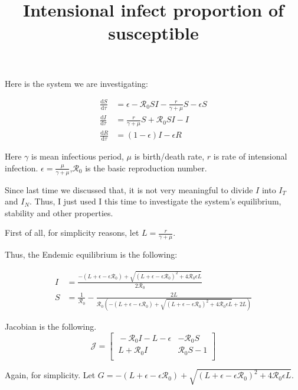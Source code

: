 \documentclass[12pt]{article}
\title{Intensional infect proportion of susceptible}
\begin{document}
\maketitle

Here is the system we are investigating:
\begin{flushleft}
\begin{align}
\frac{\mathrm{d}S}{\mathrm{d}\tau}&=\epsilon -\mathcal{R}_0 SI-\frac{r}{\gamma+\mu} S-\epsilon S\\
\frac{\mathrm{d}I}{\mathrm{d}\tau}&=\frac{r}{\gamma+\mu}S+\mathcal{R}_0 SI-I\\
\frac{\mathrm{d}R}{\mathrm{d}\tau}&=(1-\epsilon)I-\epsilon R
\end{align}

Here $\gamma$ is mean infectious period, $\mu$ is birth/death rate, $r$ is rate of intensional infection. $\epsilon=\frac{\mu}{\gamma+\mu}$,$\mathcal{R}_0$ is the basic reproduction number.

Since last time we discussed that, it is not very meaningful to divide $I$ into $I_T$ and $I_N$. Thus, I just used I this time to investigate the system's equilibrium, stability and other properties.

First of all, for simplicity reasons, let $L=\frac{r}{\gamma+\mu}$.

Thus, the Endemic equilibrium is the following:

\begin{align}
I &= \frac{-(L+\epsilon-\epsilon\mathcal{R}_0)+\sqrt{(L+\epsilon-\epsilon\mathcal{R}_0)^2+4\mathcal{R}_0\epsilon L}}{2\mathcal{R}_0}\\
S &= \frac{1}{\mathcal{R}_0}-\frac{2L}{\mathcal{R}_0(-(L+\epsilon-\epsilon\mathcal{R}_0)+\sqrt{(L+\epsilon-\epsilon\mathcal{R}_0)^2+4\mathcal{R}_0\epsilon L}+2L)}
\end{align}

Jacobian is the following.
\begin{equation}
\mathcal{J} =
\begin{bmatrix}
    \ -\mathcal{R}_0 I-L-\epsilon       & -\mathcal{R}_0 S \\
    \ L+\mathcal{R}_0 I       & \mathcal{R}_0 S-1 \\
\end{bmatrix}
\end{equation}

Again, for simplicity. Let $G=-(L+\epsilon-\epsilon\mathcal{R}_0)+\sqrt{(L+\epsilon-\epsilon\mathcal{R}_0)^2+4\mathcal{R}_0\epsilon L}$.


\end{flushleft}
\end{document}
